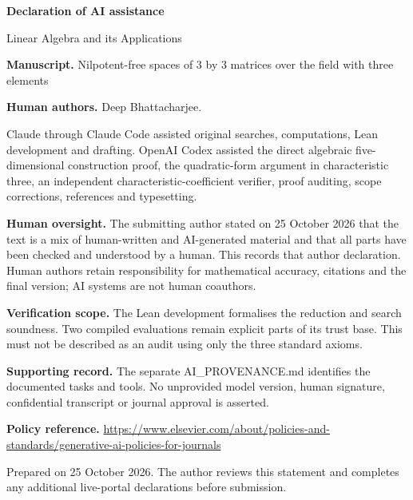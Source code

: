 \documentclass[11pt]{article}
\begin{document}
{\Large\bfseries\color{ink} Declaration of AI assistance}\par
Linear Algebra and its Applications\par{}\par\medskip
\textbf{Manuscript.} Nilpotent-free spaces of 3 by 3 matrices over the field with three elements\par

\textbf{Human authors.} Deep Bhattacharjee.\par

Claude through Claude Code assisted original searches, computations, Lean development and drafting. OpenAI Codex assisted the direct algebraic five-dimensional construction proof, the quadratic-form argument in characteristic three, an independent characteristic-coefficient verifier, proof auditing, scope corrections, references and typesetting.\par

\textbf{Human oversight.} The submitting author stated on 25 October 2026 that the text is a mix of human-written and AI-generated material and that all parts have been checked and understood by a human. This records that author declaration. Human authors retain responsibility for mathematical accuracy, citations and the final version; AI systems are not human coauthors.\par

\textbf{Verification scope.} The Lean development formalises the reduction and search soundness. Two compiled evaluations remain explicit parts of its trust base. This must not be described as an audit using only the three standard axioms.\par

\textbf{Supporting record.} The separate AI\_PROVENANCE.md identifies the documented tasks and tools. No unprovided model version, human signature, confidential transcript or journal approval is asserted.\par

\textbf{Policy reference.} \url{https://www.elsevier.com/about/policies-and-standards/generative-ai-policies-for-journals}\par

{\small Prepared on 25 October 2026. The author reviews this statement and completes any additional live-portal declarations before submission.}
\end{document}
